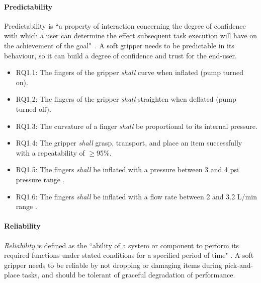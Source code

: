 \documentclass[letterpaper, 10 pt, conference]{ieeeconf}  %
\begin{document}
	\paragraph{\textbf{Predictability}}\label{predictability}
	Predictability is ``a property of interaction concerning the degree of confidence with which a user can determine the effect subsequent task execution will have on the achievement of the goal"~\cite{Abowd1991}. A soft gripper needs to be predictable in its behaviour, so it can build a degree of confidence and trust for the end-user.  
	\begin{itemize}[leftmargin=*]
		\item RQ1.1: The fingers of the gripper \emph{shall} curve when inflated (pump turned on).  
		\item RQ1.2: The fingers of the gripper \emph{shall} straighten when deflated (pump turned off).  
		\item RQ1.3: The curvature of a finger \emph{shall} be proportional to its internal pressure. 
		\item RQ1.4: The gripper \emph{shall} grasp, transport, and place an item successfully with a repeatability of $\ge$95\%.
		\item RQ1.5: The fingers \emph{shall} be inflated with a pressure between 3 and 4 psi pressure range \cite{Partridge2022}. 
		\item RQ1.6: The fingers \emph{shall} be inflated with a flow rate between 2 and 3.2 L/min range \cite{DEWIN2022}.
	\end{itemize}
	
	\paragraph{\textbf{Reliability}}\label{reliability}
	\emph{Reliability} is defined as the ``ability of a system or component to perform its required functions under stated conditions for a specified period of time" \cite{ISO24765:2017}. A soft gripper needs to be reliable by not dropping or damaging items during pick-and-place tasks, and should be tolerant of graceful degradation of performance.
	
\end{document}
